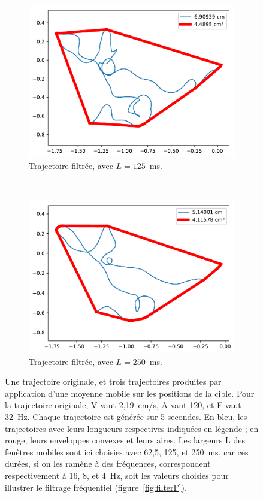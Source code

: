 \begin{figure}[htbp]
\begin{subfigure}[t]{0.49\textwidth}
			\centering
			\includegraphics[width=\textwidth]{figures/ch5/2_19_MovingAverage_2_19_120_32_window_125_0}
			\caption{Trajectoire filtrée, avec $L = 125$~ms.}
			\label{fig:movAv1250}
		\end{subfigure}		
		~
		\begin{subfigure}[t]{0.49\textwidth}
			\centering
			\includegraphics[width=\textwidth]{figures/ch5/2_19_MovingAverage_2_19_120_32_window_250_0}
			\caption{Trajectoire filtrée, avec $L = 250$~ms.}
			\label{fig:movAv2500}
		\end{subfigure}
		\caption[Filtrage des trajectoires par moyenne mobile]{Une trajectoire originale, et trois trajectoires produites par application d'une moyenne mobile sur les positions de la cible. Pour la trajectoire originale, V vaut 2,19~cm/s, A vaut 120\textdegree{}, et F vaut 32~Hz. Chaque trajectoire est générée sur 5 secondes. En bleu, les trajectoires avec leurs longueurs respectives indiquées en légende ; en rouge, leurs enveloppes convexes et leurs aires. Les largeurs L des fenêtres mobiles sont ici choisies avec 62,5, 125, et 250~ms, car ces durées, si on les ramène à des fréquences, correspondent respectivement à 16, 8, et 4~Hz, soit les valeurs choisies pour illustrer le filtrage fréquentiel (figure~\ref{fig:filterF}).}
		\label{fig:movingAverageTrajs}
	\end{figure}
	
